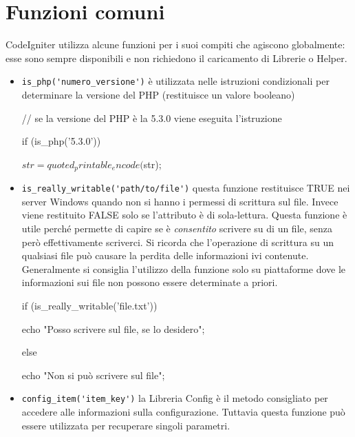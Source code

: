 \section{Funzioni comuni}
\label{cap:funzionicomuni}

CodeIgniter utilizza alcune funzioni per i suoi compiti che agiscono globalmente: esse sono sempre disponibili e non richiedono il caricamento di Librerie o Helper.

\begin{itemize}
\item \verb|is_php('numero_versione')| è utilizzata nelle istruzioni condizionali per determinare la versione del \ac{PHP} (restituisce un valore booleano)

\begin{code}
// se la versione del PHP è la 5.3.0 viene eseguita l'istruzione

if (is_php('5.3.0')) {

	$str = quoted_printable_encode($str);
	
}
\end{code}

\item \verb|is_really_writable('path/to/file')| questa funzione restituisce TRUE nei server Windows quando non si hanno i permessi di scrittura sul file. Invece viene restituito FALSE solo se l'attributo è di sola-lettura. Questa funzione è utile perché permette di capire se è \emph{consentito} scrivere su di un file, senza però effettivamente scriverci. Si ricorda che l'operazione di scrittura su un qualsiasi file può causare la perdita delle informazioni ivi contenute. Generalmente si consiglia l'utilizzo della funzione solo su piattaforme dove le informazioni sui file non possono essere determinate a priori.

\begin{code}
if (is_really_writable('file.txt')) {

	echo "Posso scrivere sul file, se lo desidero";

}

else {

    echo "Non si può scrivere sul file";

}
\end{code}

\item \verb|config_item('item_key')| la Libreria Config è il metodo consigliato per accedere alle informazioni sulla configurazione. Tuttavia questa funzione può essere utilizzata per recuperare singoli parametri.


\end{itemize}
